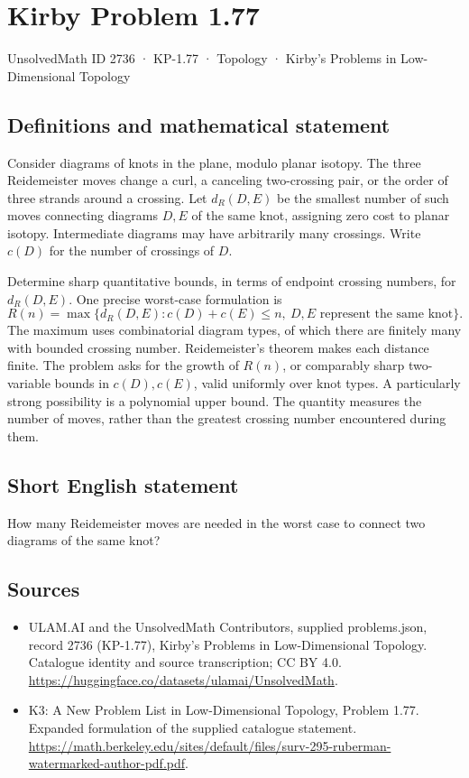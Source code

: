 \documentclass[11pt,a4paper]{article}
\begin{document}
\section*{Kirby Problem 1.77}\label{2736}
{\small UnsolvedMath ID 2736 · KP-1.77 · Topology · Kirby's Problems in Low-Dimensional Topology}
\subsection{Definitions and mathematical statement}
Consider diagrams of knots in the plane, modulo planar isotopy. The three
Reidemeister moves change a curl, a canceling two-crossing pair, or the order of
three strands around a crossing. Let $d_R(D,E)$ be the smallest number of such
moves connecting diagrams $D,E$ of the same knot, assigning zero cost to planar
isotopy. Intermediate diagrams may have arbitrarily many crossings.
Write $c(D)$ for the number of crossings of $D$.

Determine sharp quantitative bounds, in terms of endpoint crossing numbers,
for $d_R(D,E)$. One precise worst-case formulation is
\[
R(n)=\max\{d_R(D,E):c(D)+c(E)\leq n,\ D,E\text{ represent the same knot}\}.
\]
The maximum uses combinatorial diagram types, of which there are finitely many
with bounded crossing number. Reidemeister's theorem makes each distance finite.
The problem asks for the growth of $R(n)$, or comparably sharp two-variable
bounds in $c(D),c(E)$, valid uniformly over knot types. A particularly strong
possibility is a polynomial upper bound. The quantity measures the number of
moves, rather than the greatest crossing number encountered during them.
\subsection{Short English statement}
How many Reidemeister moves are needed in the worst case to connect two diagrams of the same knot?
\subsection{Sources}
\begin{itemize}
\item[S1] ULAM.AI and the UnsolvedMath Contributors, supplied problems.json, record 2736 (KP-1.77), Kirby's Problems in Low-Dimensional Topology. Catalogue identity and source transcription; CC BY 4.0.
\url{https://huggingface.co/datasets/ulamai/UnsolvedMath}.
\item[S2] K3: A New Problem List in Low-Dimensional Topology, Problem 1.77. Expanded formulation of the supplied catalogue statement.
\url{https://math.berkeley.edu/sites/default/files/surv-295-ruberman-watermarked-author-pdf.pdf}.
\end{itemize}
\end{document}
